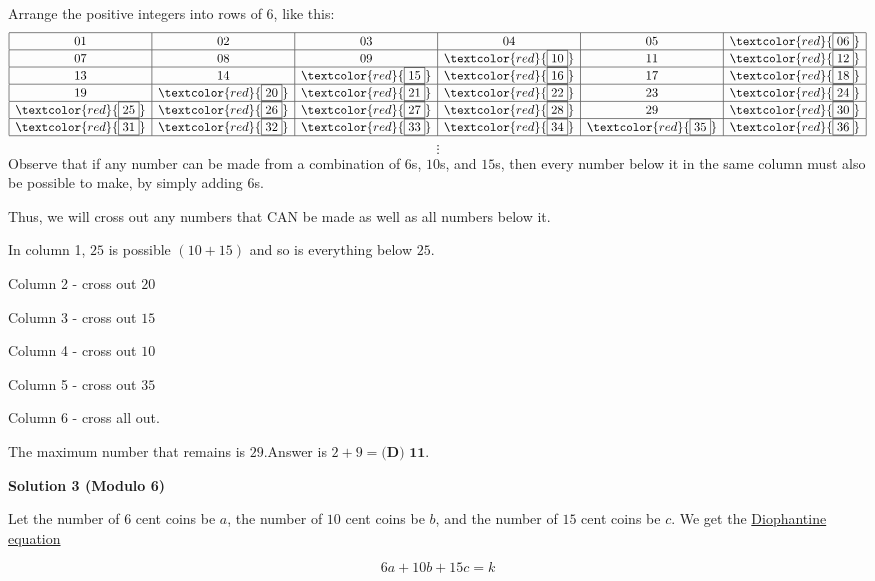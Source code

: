 \begin{enumerate}
Arrange the positive integers into rows of $6$, like this:
 \[\begin{array}{|c|c|c|c|c|c|} \hline 01 & 02 & 03 & 04 & 05 & \textcolor{red}{\boxed{06}} \\ \hline 07 & 08 & 09 & \textcolor{red}{\boxed{10}} & 11 & \textcolor{red}{\boxed{12}} \\ \hline 13 & 14 & \textcolor{red}{\boxed{15}} & \textcolor{red}{\boxed{16}} & 17 & \textcolor{red}{\boxed{18}} \\ \hline 19 & \textcolor{red}{\boxed{20}} & \textcolor{red}{\boxed{21}} & \textcolor{red}{\boxed{22}} & 23 & \textcolor{red}{\boxed{24}} \\ \hline \textcolor{red}{\boxed{25}} & \textcolor{red}{\boxed{26}} & \textcolor{red}{\boxed{27}} & \textcolor{red}{\boxed{28}} & 29 & \textcolor{red}{\boxed{30}} \\ \hline \textcolor{red}{\boxed{31}} & \textcolor{red}{\boxed{32}} & \textcolor{red}{\boxed{33}} & \textcolor{red}{\boxed{34}} & \textcolor{red}{\boxed{35}} & \textcolor{red}{\boxed{36}} \\ \hline \end{array}\]
 \[\vdots\]Observe that if any number can be made from a combination of $6$s, $10$s, and $15$s, then every number below it in the same column must also be possible to make, by simply adding 6s.

 Thus, we will cross out any numbers that CAN be made as well as all numbers below it.

 In column 1, $25$ is possible $(10+15)$ and so is everything below $25$.

 Column 2 - cross out $20$

 Column 3 - cross out $15$

 Column 4 - cross out $10$

 Column 5 - cross out $35$

 Column 6 - cross all out.

 The maximum number that remains is $29$.Answer is $2+9= \boxed{\textbf{(D) 11}}$.

 



\textbf{Solution 3 (Modulo 6)}

Let the number of $6$ cent coins be $a$, the number of $10$ cent coins be $b$, and the number of $15$ cent coins be $c$. We get the \href{https://artofproblemsolving.com/wiki/index.php?title=Diophantine\_equation}{Diophantine equation}

 
 \[6a + 10b + 15c = k\]


\end{enumerate}
